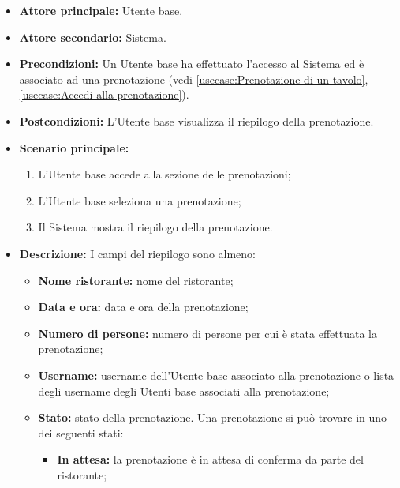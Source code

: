 \label{usecase:Visualizzazione del riepilogo}
\begin{itemize}
	\item \textbf{Attore principale:} Utente base.

	\item \textbf{Attore secondario:} Sistema.

	\item \textbf{Precondizioni:}
	      Un Utente base ha effettuato l'accesso al Sistema ed è associato ad una
	      prenotazione (vedi \autoref{usecase:Prenotazione di un tavolo},
	      \autoref{usecase:Accedi alla prenotazione}).

	\item \textbf{Postcondizioni:}
	      L'Utente base visualizza il riepilogo della prenotazione.

	\item \textbf{Scenario principale:}
	      \begin{enumerate}
		      \item L'Utente base accede alla sezione delle prenotazioni;
		      \item L'Utente base seleziona una prenotazione;
		      \item Il Sistema mostra il riepilogo della prenotazione.
	      \end{enumerate}

	\item \textbf{Descrizione:}
	      I campi del riepilogo sono almeno:
	      \begin{itemize}
		      \item \textbf{Nome ristorante:} nome del ristorante;
		      \item \textbf{Data e ora:} data e ora della prenotazione;
		      \item \textbf{Numero di persone:} numero di persone per cui è
		            stata effettuata la prenotazione;
		      \item \textbf{Username:} username dell'Utente base
		            associato alla prenotazione o lista degli username degli
		            Utenti base associati alla prenotazione;

		      \item \textbf{Stato:} stato della prenotazione. Una
		            prenotazione si può trovare in uno dei seguenti stati:
		            \begin{itemize}
			            \item \textbf{In attesa:} la prenotazione è
			                  in attesa di conferma da parte del ristorante;


\end{itemize}
\end{itemize}
\end{itemize}
